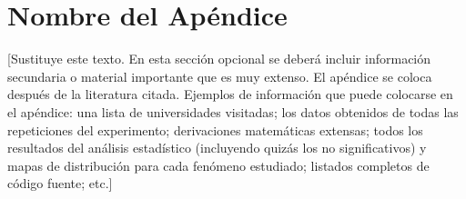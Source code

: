 \chapter{Nombre del Apéndice}\label{apendiceA}

[Sustituye este texto.
En esta sección opcional se deberá incluir información secundaria o material importante que es muy extenso. El apéndice se coloca después de la literatura citada. Ejemplos de información que puede colocarse en el apéndice: una lista de universidades visitadas; los datos obtenidos de todas las repeticiones del experimento; derivaciones matemáticas extensas; todos los resultados del análisis estadístico (incluyendo quizás los no significativos) y mapas de distribución para cada fenómeno estudiado; listados completos de código fuente; etc.]